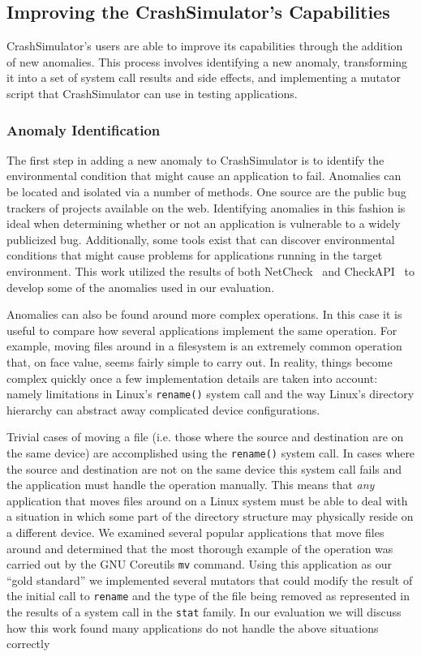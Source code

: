 \subsection{Improving the CrashSimulator's Capabilities}

CrashSimulator's users are able to improve its capabilities through
the addition of new anomalies.  This process involves identifying a new
anomaly, transforming it into a set of system call results and side
effects, and implementing a mutator script that CrashSimulator can use in
testing applications.

\subsubsection{Anomaly Identification} \label{subsec:anomalyidentification}

The first step in adding a new anomaly to CrashSimulator is to identify the
environmental condition that might cause an application to fail.
Anomalies can be located and isolated via a number of methods. One source
are the public bug trackers of projects available on the web.
Identifying anomalies in this fashion is ideal when determining
whether or not an application is vulnerable to a widely publicized bug.
Additionally, some tools exist that can discover environmental conditions
that might cause problems
for applications
running in the target environment.  This
work utilized the results of both NetCheck~\cite{Zhuang_NSDI_2014} and
CheckAPI~\cite{rasley2015detecting}
to develop some of the
anomalies used in our evaluation.

Anomalies can also be found around more complex operations.  In this case
it is useful to compare how several applications implement the same
operation.  For example, moving files
around in a filesystem is an extremely common operation that, on face
value, seems fairly simple to carry out.  In reality, things become
complex quickly once a few implementation details are taken into account:
namely limitations in Linux's {\tt rename()} system call and the way
Linux's directory hierarchy can abstract away complicated device
configurations.

Trivial cases of moving a file (i.e. those where the source and destination
are on the same device) are accomplished using the {\tt rename()} system
call.  In cases where the source and destination are not on the same device
this system call fails and the application must handle the operation
manually. This means that \emph{any} application that moves files around on
a Linux system must be able to deal with a situation in which some part of
the directory structure may physically reside on a different device.
We examined several popular applications that move files around and
determined that the most thorough example of the operation was carried out
by
the GNU Coreutils {\tt mv} command.  Using this application as our
``gold standard''  we implemented several mutators that
could modify the result of the initial call to {\tt rename} and the
type of the file being removed as represented in the results of a system
call in the {\tt stat} family.
In our evaluation we will discuss how this work found many applications
do not handle the above situations correctly

